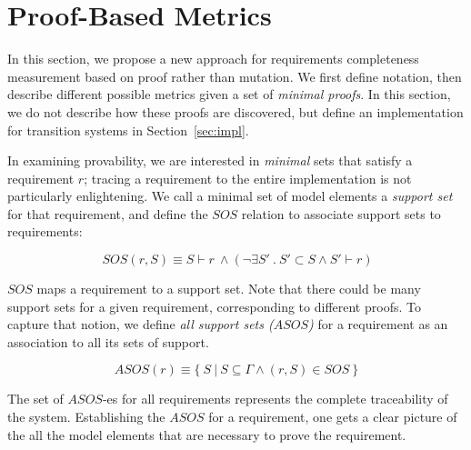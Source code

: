 \newcommand{\minproofcov}{\text{\sc MinProof-Cov}}


\section{Proof-Based Metrics}
\label{sec:method}

In this section, we propose a new approach for requirements completeness measurement based on proof rather than mutation.  We first define notation, then describe different possible metrics given a set of {\em minimal proofs}.  In this section, we do not describe how these proofs are discovered, but define an implementation for transition systems in Section~\ref{sec:impl}.

In examining provability, we are interested in {\em minimal} sets that satisfy a requirement $r$; tracing a requirement to the entire implementation is not particularly enlightening.  We call a minimal set of model elements a \emph{support set} for that requirement, and define the $SOS$ relation to associate support sets to requirements:

$$ \ SOS(r, S) \equiv S \vdash r~ \land   (\neg\exists S'\ .\ S' \subset S \wedge S' \vdash r) $$

\noindent $SOS$ maps a requirement to a support set. Note that there could be many support sets for a given requirement, corresponding to different proofs. To capture that notion, we define \emph{all support sets ($ASOS$)} for a requirement as an association to all its sets of support.


$$ ASOS(r) \equiv  \{\ S~|~S \subseteq \Gamma \land (r,S) \in SOS\ \} $$

\noindent The set of $ASOS$-es for all requirements represents the complete traceability of the system. Establishing the $ASOS$ for a requirement, one gets a clear picture of the all the model elements that are necessary to prove the requirement.




